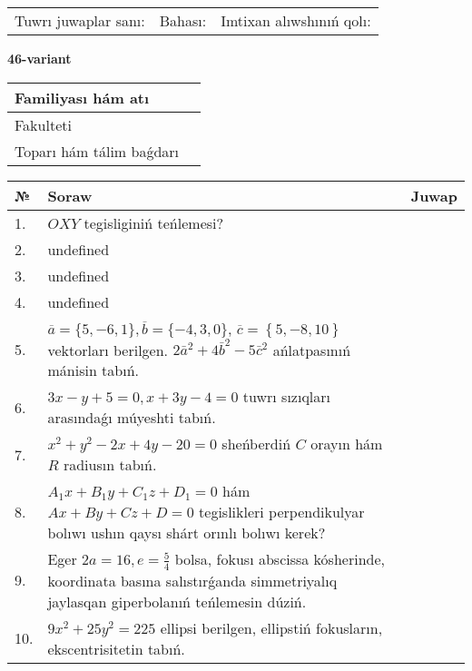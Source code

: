 \documentclass{article}
\begin{document}
\vspace{0.7cm}

\begin{tabular}{lll}
Tuwrı juwaplar sanı: \underline{\hspace{1cm}} & 
Bahası: \underline{\hspace{1cm}} & 
Imtixan alıwshınıń qolı: \underline{\hspace{2cm}} \\
\end{tabular}

\egroup

\newpage


\textbf{46-variant}\\

\bgroup
\def\arraystretch{1.6} %

\begin{tabular}{|m{5.7cm}|m{9.5cm}|}
\hline
Familiyası hám atı & \\
\hline
Fakulteti  & \\
\hline
Toparı hám tálim baǵdarı  & \\
\hline
\end{tabular}

\vspace{0.7cm}

\begin{tabular}{|m{0.7cm}|m{10cm}|m{4cm}|}
\hline
№ & Soraw & Juwap \\
\hline
1. & \(OXY\) tegisliginiń teńlemesi? &  \\
\hline
2. & undefined &  \\
\hline
3. & undefined &  \\
\hline
4. & undefined &  \\
\hline
5. & \(\overline{a} = \{5,- 6, 1 \}, \overline{b} = \{ - 4, 3, 0 \} \), \(\overline{c} = \left\{ 5,- 8, 10 \right\}\) vektorları berilgen. \(2{\bar{a}}^{2} + 4{\bar{b}}^{2} - 5{\bar{c}}^{2}\) ańlatpasınıń mánisin tabıń. &  \\
\hline
6. & \(3 x - y + 5 = 0, x + 3 y - 4 = 0\) tuwrı sızıqları arasındaǵı múyeshti tabıń. &  \\
\hline
7. & \(x^{2} + y^{2} - 2 x + 4 y - 20 = 0\) sheńberdiń \(C\) orayın hám \(R\) radiusın tabıń. &  \\
\hline
8. & \(A_{1}x + B_{1}y + C_{1}z + D_{1} = 0\) hám \(Ax + By + Cz + D = 0\) tegislikleri perpendikulyar bolıwı ushın qaysı shárt orınlı bolıwı kerek? &  \\
\hline
9. & Eger \(2 a = 16, e = \frac{5}{4}\) bolsa, fokusı abscissa kósherinde, koordinata basına salıstırǵanda simmetriyalıq jaylasqan giperbolanıń teńlemesin dúziń. &  \\
\hline
10. & \(9 x^{2} + 25 y^{2} = 225\) ellipsi berilgen, ellipstiń fokusların, ekscentrisitetin tabıń. & \\
\hline
\end{tabular}
\end{document}
